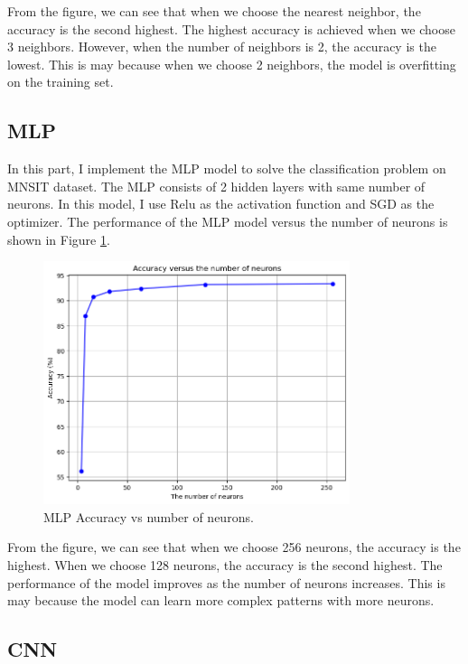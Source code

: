 \documentclass[12pt]{article}
\begin{document}
From the figure, we can see that when we choose the nearest neighbor, the accuracy is the second highest.
The highest accuracy is achieved when we choose 3 neighbors.
However, when the number of neighbors is 2, the accuracy is the lowest.
This is may because when we choose 2 neighbors, the model is overfitting on the training set.

\subsection{MLP}

In this part, I implement the MLP model to solve the classification problem on MNSIT dataset.
The MLP consists of 2 hidden layers with same number of neurons.
In this model, I use Relu as the activation function and SGD as the optimizer.
The performance of the MLP model versus the number of neurons is shown in Figure \ref{fig:mlp_accuracy}.

\begin{figure}[H] %
  \centering
  \includegraphics[width=0.8\textwidth]{MLP.png} %
  \caption{MLP Accuracy vs number of neurons.}
  \label{fig:mlp_accuracy} %
\end{figure}

From the figure, we can see that when we choose 256 neurons, the accuracy is the highest.
When we choose 128 neurons, the accuracy is the second highest.
The performance of the model improves as the number of neurons increases.
This is may because the model can learn more complex patterns with more neurons.

\subsection{CNN}
\end{document}
